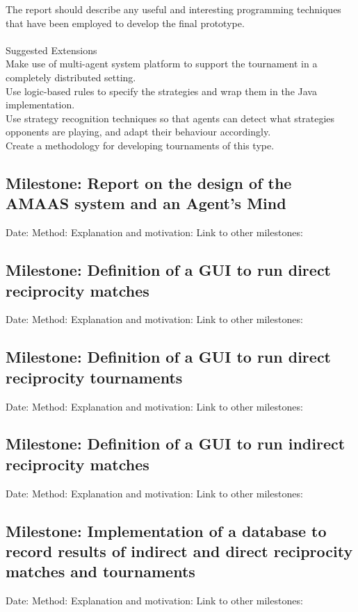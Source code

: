 \documentclass{article}
\begin{document}
{The report should describe any useful and interesting programming techniques that have been employed to develop the final prototype.\\\\
Suggested Extensions\\
Make use of multi-agent system platform to support the tournament in a completely distributed setting.\\
Use logic-based rules to specify the strategies and wrap them in the Java implementation.\\
Use strategy recognition techniques so that agents can detect what strategies opponents are playing, and adapt their behaviour accordingly.\\
Create a methodology for developing tournaments of this type.\\}

\subsection*{Milestone: Report on the design of the AMAAS system and an Agent's Mind}
Date:
Method: 
Explanation and motivation:
Link to other milestones:

\subsection*{Milestone: Definition of a GUI to run direct reciprocity matches}
Date:
Method: 
Explanation and motivation:
Link to other milestones:

\subsection*{Milestone: Definition of a GUI to run direct reciprocity tournaments}
Date:
Method: 
Explanation and motivation:
Link to other milestones:

\subsection*{Milestone: Definition of a GUI to run indirect reciprocity matches}
Date:
Method: 
Explanation and motivation:
Link to other milestones:

\subsection*{Milestone: Implementation of a database to record results of indirect and direct reciprocity matches and tournaments}
Date:
Method: 
Explanation and motivation:
Link to other milestones:
\end{document}

